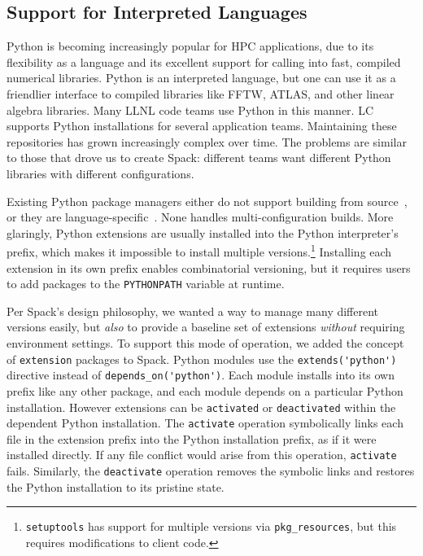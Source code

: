 
\subsection{Support for Interpreted Languages}
\label{sec:usecase-python}

Python is becoming increasingly popular for HPC applications,
due to its flexibility as a language and its excellent support
for calling into fast, compiled numerical libraries.
Python is an interpreted language, but one can use it
as a friendlier interface to compiled libraries like FFTW, ATLAS, and
other linear algebra libraries.  Many LLNL code teams use Python in this manner.
%
LC supports Python installations for several application teams.
Maintaining these repositories has grown increasingly complex over
time. The problems are similar to those that drove us to create
Spack: different teams want different Python libraries with different
configurations.

Existing Python package managers either do not support building from
source~\cite{anaconda,conda}, or they are language-specific~\cite{eby:setuptools}.
None handles multi-configuration builds.  More glaringly, Python extensions
are usually installed into the Python interpreter's prefix, which makes it 
impossible to install multiple versions.\footnote{{\tt setuptools}
has support for multiple versions via {\tt pkg_resources},
but this requires modifications to client code.}
Installing each extension in its own prefix enables combinatorial versioning,
but it requires users to add packages to the {\tt PYTHONPATH} variable at runtime.

Per Spack's design philosophy, we wanted a way to manage many different
versions easily, but {\it also} to provide a baseline set of extensions 
{\it without} requiring environment settings.
%
To support this mode of operation, we added the concept of {\tt extension} packages
to Spack. Python modules use the \verb|extends('python')| directive instead of
\verb|depends_on('python')|.
Each module installs into its own prefix like any other package,
and each module depends on a particular Python installation.
However extensions can be {\tt activated} or {\tt deactivated}
within the dependent Python installation.  The {\tt activate} operation
symbolically links each file in the extension prefix into the Python
installation prefix, as if it were installed directly. If any file
conflict would arise from this operation, {\tt activate} fails.
Similarly, the {\tt deactivate} operation removes the symbolic links and restores
the Python installation to its  pristine state.

